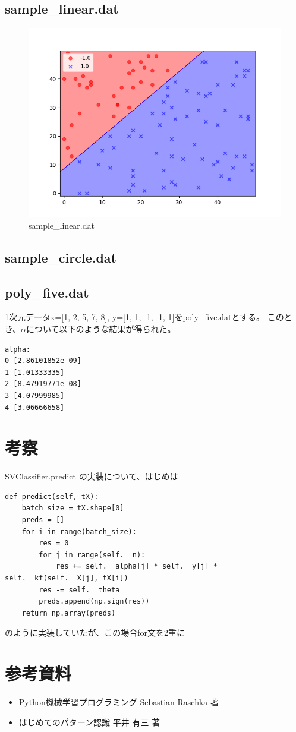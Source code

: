 \documentclass{jsarticle}
\begin{document}
\subsection{sample\_linear.dat}
\begin{figure}[!h]
\centering \includegraphics[width=15cm]{sample_linear.png}
\caption{sample\_linear.dat}
\end{figure}

\subsection{sample\_circle.dat}
\subsection{poly\_five.dat}
1次元データx=[1, 2, 5, 7, 8], y=[1, 1, -1, -1, 1]をpoly\_five.datとする。
このとき、$\alpha$について以下のような結果が得られた。
\begin{lstlisting}
alpha: 
0 [2.86101852e-09]
1 [1.01333335]
2 [8.47919771e-08]
3 [4.07999985]
4 [3.06666658]
\end{lstlisting}

\section{考察}
SVClassifier.predict の実装について、はじめは
\begin{lstlisting}
def predict(self, tX):
    batch_size = tX.shape[0]
    preds = []
    for i in range(batch_size):
        res = 0
        for j in range(self.__n):
            res += self.__alpha[j] * self.__y[j] * self.__kf(self.__X[j], tX[i])
        res -= self.__theta
        preds.append(np.sign(res))
    return np.array(preds)
\end{lstlisting}
のように実装していたが、この場合for文を2重に

\section{参考資料}
\begin{itemize}
    \item Python機械学習プログラミング Sebastian Raschka 著
    \item はじめてのパターン認識 平井 有三 著
\end{itemize}
\end{document}
